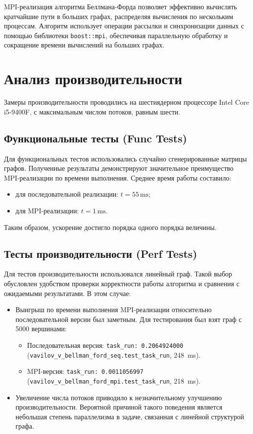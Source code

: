\documentclass[12pt]{article}
\begin{document}
MPI-реализация алгоритма Беллмана-Форда позволяет эффективно вычислять кратчайшие пути в больших графах, распределяя вычисления по нескольким процессам. Алгоритм использует операции рассылки и синхронизации данных с помощью библиотеки \texttt{boost::mpi}, обеспечивая параллельную обработку и сокращение времени вычислений на больших графах.

\section{Анализ производительности}

Замеры производительности проводились на шестиядерном процессоре Intel Core i5-9400F, с максимальным числом потоков, равным шести. 

\subsection{Функциональные тесты (Func Tests)}

Для функциональных тестов использовались случайно сгенерированные матрицы графов. Полученные результаты демонстрируют значительное преимущество MPI-реализации по времени выполнения. Среднее время работы составило:
\begin{itemize}
    \item для последовательной реализации: \(t = 55 \, \text{ms}\);
    \item для MPI-реализации: \(t = 1 \, \text{ms}\).
\end{itemize}
Таким образом, ускорение достигло порядка одного порядка величины.

\subsection{Тесты производительности (Perf Tests)}

Для тестов производительности использовался линейный граф. Такой выбор обусловлен удобством проверки корректности работы алгоритма и сравнения с ожидаемыми результатами. В этом случае:

\begin{itemize}
    \item Выигрыш по времени выполнения MPI-реализации относительно последовательной версии был заметным. 
    Для тестирования был взят граф с 5000 вершинами:
    \begin{itemize}
        \item Последовательная версия: \texttt{task\_run: 0.2064924000} (\texttt{vavilov\_v\_bellman\_ford\_seq.test\_task\_run}, 248~ms).
        \item MPI-версия: \texttt{task\_run: 0.0011056997} (\texttt{vavilov\_v\_bellman\_ford\_mpi.test\_task\_run}, 218~ms).
    \end{itemize}
    \item Увеличение числа потоков приводило к незначительному улучшению производительности. Вероятной причиной такого поведения является небольшая степень параллелизма в задаче, связанная с линейной структурой графа.
\end{itemize}
\end{document}
